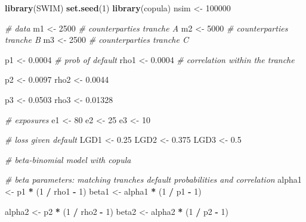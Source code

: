 \documentclass[]{article}
\newenvironment{Shaded}{\begin{snugshade}}{\end{snugshade}}
\newcommand{\CommentTok}[1]{\textcolor[rgb]{0.56,0.35,0.01}{\textit{#1}}}
\newcommand{\DecValTok}[1]{\textcolor[rgb]{0.00,0.00,0.81}{#1}}
\newcommand{\FloatTok}[1]{\textcolor[rgb]{0.00,0.00,0.81}{#1}}
\newcommand{\KeywordTok}[1]{\textcolor[rgb]{0.13,0.29,0.53}{\textbf{#1}}}
\newcommand{\NormalTok}[1]{#1}
\newcommand{\OperatorTok}[1]{\textcolor[rgb]{0.81,0.36,0.00}{\textbf{#1}}}
\newcommand{\StringTok}[1]{\textcolor[rgb]{0.31,0.60,0.02}{#1}}
\begin{document}
\begin{Shaded}
\begin{Highlighting}[]
  \KeywordTok{library}\NormalTok{(SWIM)}
  \KeywordTok{set.seed}\NormalTok{(}\DecValTok{1}\NormalTok{)}
  \KeywordTok{library}\NormalTok{(copula)}
\NormalTok{  nsim <-}\StringTok{ }\DecValTok{100000}
  
\CommentTok{# data}
\NormalTok{  m1 <-}\StringTok{ }\DecValTok{2500} \CommentTok{# counterparties tranche A}
\NormalTok{  m2 <-}\StringTok{ }\DecValTok{5000} \CommentTok{# counterparties tranche B}
\NormalTok{  m3 <-}\StringTok{ }\DecValTok{2500} \CommentTok{# counterparties tranche C}
  
\NormalTok{  p1 <-}\StringTok{ }\FloatTok{0.0004} \CommentTok{# prob of default }
\NormalTok{  rho1 <-}\StringTok{ }\FloatTok{0.0004} \CommentTok{# correlation within the tranche}

\NormalTok{  p2 <-}\StringTok{ }\FloatTok{0.0097} 
\NormalTok{  rho2 <-}\StringTok{ }\FloatTok{0.0044}
  
\NormalTok{  p3 <-}\StringTok{ }\FloatTok{0.0503}  
\NormalTok{  rho3 <-}\StringTok{ }\FloatTok{0.01328}
  
\CommentTok{# exposures}
\NormalTok{  e1 <-}\StringTok{ }\DecValTok{80}
\NormalTok{  e2 <-}\StringTok{ }\DecValTok{25} 
\NormalTok{  e3 <-}\StringTok{ }\DecValTok{10} 
  
\CommentTok{# loss given default}
\NormalTok{  LGD1 <-}\StringTok{ }\FloatTok{0.25}
\NormalTok{  LGD2 <-}\StringTok{ }\FloatTok{0.375}
\NormalTok{  LGD3 <-}\StringTok{ }\FloatTok{0.5}
  
\CommentTok{# beta-binomial model with copula }
  
\CommentTok{# beta parameters: matching tranches default probabilities and correlation}
\NormalTok{  alpha1 <-}\StringTok{ }\NormalTok{p1 }\OperatorTok{*}\StringTok{ }\NormalTok{(}\DecValTok{1} \OperatorTok{/}\StringTok{ }\NormalTok{rho1 }\OperatorTok{-}\StringTok{ }\DecValTok{1}\NormalTok{)}
\NormalTok{  beta1 <-}\StringTok{ }\NormalTok{alpha1 }\OperatorTok{*}\StringTok{ }\NormalTok{(}\DecValTok{1} \OperatorTok{/}\StringTok{ }\NormalTok{p1 }\OperatorTok{-}\StringTok{ }\DecValTok{1}\NormalTok{)}
  
\NormalTok{  alpha2 <-}\StringTok{ }\NormalTok{p2 }\OperatorTok{*}\StringTok{ }\NormalTok{(}\DecValTok{1} \OperatorTok{/}\StringTok{ }\NormalTok{rho2 }\OperatorTok{-}\StringTok{ }\DecValTok{1}\NormalTok{)}
\NormalTok{  beta2 <-}\StringTok{ }\NormalTok{alpha2 }\OperatorTok{*}\StringTok{ }\NormalTok{(}\DecValTok{1} \OperatorTok{/}\StringTok{ }\NormalTok{p2 }\OperatorTok{-}\StringTok{ }\DecValTok{1}\NormalTok{)}
  

\end{Highlighting}
\end{Shaded}
\end{document}
